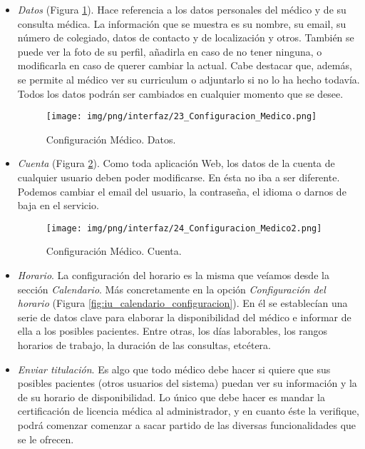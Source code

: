 \documentclass[a4paper,oneside,11pt]{book}
\begin{document}
		\begin{itemize}
			\item \textit{Datos} (Figura \ref{fig:iu_configuracion_datos}). Hace referencia a los datos personales del médico y de su consulta médica. La información que se muestra es su nombre, su email, su número de colegiado, datos de contacto y de localización y otros. También se puede ver la foto de su perfil, añadirla en caso de no tener ninguna, o modificarla en caso de querer cambiar la actual. Cabe destacar que, además, se permite al médico ver su curriculum o adjuntarlo si no lo ha hecho todavía. Todos los datos podrán ser cambiados en cualquier momento que se desee.
			
			
			\begin{figure}[H]
			  \centering
			    \texttt{[image: img/png/interfaz/23\_Configuracion\_Medico.png]}
			  \caption{Configuración Médico. Datos.}
			  \label{fig:iu_configuracion_datos}
			\end{figure}
			
			\item \textit{Cuenta} (Figura \ref{fig:iu_configuracion_cuenta}). Como toda aplicación Web, los datos de la cuenta de cualquier usuario deben poder modificarse. En ésta no iba a ser diferente. Podemos cambiar el email del usuario, la contraseña, el idioma o darnos de baja en el servicio.
			
			\begin{figure}[H]
			  \centering
			    \texttt{[image: img/png/interfaz/24\_Configuracion\_Medico2.png]}
			  \caption{Configuración Médico. Cuenta.}
			  \label{fig:iu_configuracion_cuenta}
			\end{figure}
			
			\item \textit{Horario}. La configuración del horario es la misma que veíamos desde la sección \textit{Calendario}. Más concretamente en la opción \textit{Configuración del horario} (Figura \ref{fig:iu_calendario_configuracion}). En él se establecían una serie de datos clave para elaborar la disponibilidad del médico e informar de ella a los posibles pacientes. Entre otras, los días laborables, los rangos horarios de trabajo, la duración de las consultas, etcétera.
			
			\item \textit{Enviar titulación}. Es algo que todo médico debe hacer si quiere que sus posibles pacientes (otros usuarios del sistema) puedan ver su información y la de su horario de disponibilidad. Lo único que debe hacer es mandar la certificación de licencia médica al administrador, y en cuanto éste la verifique, podrá comenzar comenzar a sacar partido de las diversas funcionalidades que se le ofrecen.
			

\end{itemize}
\end{document}
